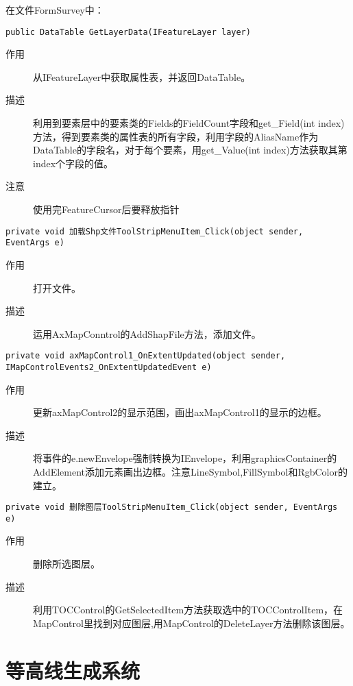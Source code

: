 \documentclass[twoside,color=blue,mathpazo,titlestyle=hang,12pt]{elegantbook}
\numberwithin{equation}{section}
\begin{document}
在文件FormSurvey中：
\begin{lstlisting}
public DataTable GetLayerData(IFeatureLayer layer)
\end{lstlisting}
\begin{description}
\item[作用] 从IFeatureLayer中获取属性表，并返回DataTable。
\item[描述] 利用到要素层中的要素类的Fields的FieldCount字段和get\_Field(int index)方法，得到要素类的属性表的所有字段，利用字段的AliasName作为DataTable的字段名，对于每个要素，用get\_Value(int index)方法获取其第index个字段的值。
\item[注意] 使用完FeatureCursor后要释放指针
\end{description}
\begin{lstlisting}
private void 加载Shp文件ToolStripMenuItem_Click(object sender, EventArgs e)
\end{lstlisting}
\begin{description}
\item[作用] 打开文件。
\item[描述] 运用AxMapConntrol的AddShapFile方法，添加文件。
\end{description}
\begin{lstlisting}
private void axMapControl1_OnExtentUpdated(object sender, IMapControlEvents2_OnExtentUpdatedEvent e)
\end{lstlisting}
\begin{description}
\item[作用] 更新axMapControl2的显示范围，画出axMapControl1的显示的边框。
\item[描述] 将事件的e.newEnvelope强制转换为IEnvelope，利用graphicsContainer的AddElement添加元素画出边框。注意LineSymbol,FillSymbol和RgbColor的建立。
\end{description}
\begin{lstlisting}
private void 删除图层ToolStripMenuItem_Click(object sender, EventArgs e)
\end{lstlisting}
\begin{description}
\item[作用] 删除所选图层。
\item[描述] 利用TOCControl的GetSelectedItem方法获取选中的TOCControlItem，在MapControl里找到对应图层,用MapControl的DeleteLayer方法删除该图层。
\end{description}




\chapter{等高线生成系统}
\end{document}
